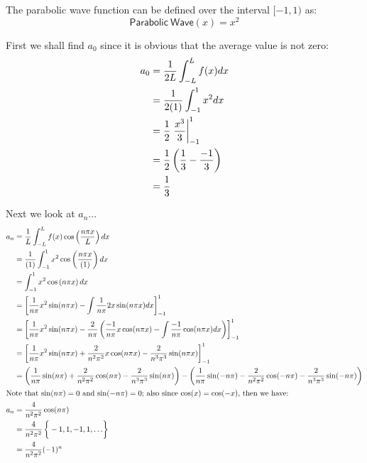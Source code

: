 \documentclass[letterpaper,8pt]{article}
\begin{document}
The parabolic wave function can be defined over the interval $[-1, 1)$ as:
\[
\mathsf{Parabolic \ Wave}(x) = x^2 
\]

First we shall find $a_0$ since it is obvious that the average value is not zero:
\begin{align*}
a_0 &= \frac{1}{2L} \int_{-L}^L f(x) dx  \\
    &= \frac{1}{2(1)} \int_{-1}^{1} x^2 dx \\
    &= \frac{1}{2} \left. \frac{x^3}{3} \vphantom{\frac{1}{2}} \right|^1_{-1} \\
    &= \frac{1}{2} \left( \frac{1}{3} - \frac{-1}{3} \right) \\
    &= \frac{1}{3}
\end{align*}

Next we look at $a_n$...
\begin{align*}
a_n &= \frac{1}{L} \int_{-L}^L f(x) \cos \left( \frac{n\pi x}{L} \right) dx \\
    &= \frac{1}{(1)} \int_{-1}^1 x^2 \cos \left( \frac{n\pi x}{(1)} \right) dx \\
    &= \int_{-1}^1 x^2 \cos \left( n\pi x \right) dx \\
    &= \left[ \frac{1}{n\pi} x^2 \sin (n\pi x) - \int \frac{1}{n\pi} 2x \sin ( n\pi x ) dx \right]^1_{-1} \\
    &= \left[ \frac{1}{n\pi} x^2 \sin (n\pi x) - \frac{2}{n\pi} \left( \frac{-1}{n\pi} x \cos (n\pi x) - \int \frac{-1}{n\pi} \cos (n\pi x) dx \right) \right]^1_{-1} \\
    &= \left[ \frac{1}{n\pi} x^2 \sin (n\pi x) + \frac{2}{n^2\pi^2} x \cos (n\pi x) - \frac{2}{n^3\pi^3} \sin (n\pi x) \right]^1_{-1} \\
    &= \left( \frac{1}{n\pi} \sin (n\pi) + \frac{2}{n^2\pi^2} \cos (n\pi) - \frac{2}{n^3\pi^3} \sin (n\pi) \right) - 
       \left( \frac{1}{n\pi} \sin (-n\pi) - \frac{2}{n^2\pi^2} \cos (-n\pi) - \frac{2}{n^3\pi^3} \sin (-n\pi) \right)  \\
\intertext{Note that $\sin(n\pi) = 0$\ and $\sin(-n\pi) = 0$; also since $\cos (x) = \cos(-x)$, then we have: }
a_n &= \frac{4}{n^2\pi^2} \cos (n\pi) \\
    &= \frac{4}{n^2\pi^2} \left\{ \vphantom{\frac{1}{1}} -1, 1, -1, 1, \ldots \right\} \\
    &= \frac{4}{n^2\pi^2} (-1)^n
\end{align*}
\end{document}
